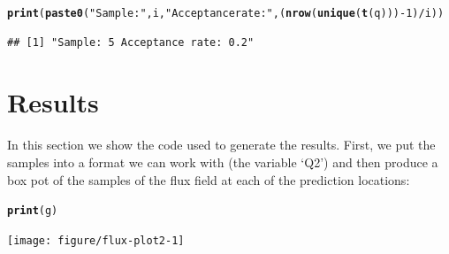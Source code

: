 \documentclass[a4paper,11pt]{article}\usepackage[]{graphicx}\usepackage[]{color}
\makeatletter
\newcommand{\hlnum}[1]{\textcolor[rgb]{0.686,0.059,0.569}{#1}}%
\newcommand{\hlstr}[1]{\textcolor[rgb]{0.192,0.494,0.8}{#1}}%
\newcommand{\hlopt}[1]{\textcolor[rgb]{0,0,0}{#1}}%
\newcommand{\hlstd}[1]{\textcolor[rgb]{0.345,0.345,0.345}{#1}}%
\newcommand{\hlkwd}[1]{\textcolor[rgb]{0.737,0.353,0.396}{\textbf{#1}}}%
\newenvironment{kframe}{%
 \def\at@end@of@kframe{}%
 \ifinner\ifhmode%
  \def\at@end@of@kframe{\end{minipage}}%
  \begin{minipage}{\columnwidth}%
 \fi\fi%
 \def\FrameCommand##1{\hskip\@totalleftmargin \hskip-\fboxsep
 \colorbox{shadecolor}{##1}\hskip-\fboxsep
     \hskip-\linewidth \hskip-\@totalleftmargin \hskip\columnwidth}%
 \MakeFramed {\advance\hsize-\width
   \@totalleftmargin\z@ \linewidth\hsize
   \@setminipage}}%
 {\par\unskip\endMakeFramed%
 \at@end@of@kframe}
\newenvironment{knitrout}{}{} %
\makeatother
\begin{document}
\begin{knitrout}
\color{fgcolor}\begin{kframe}
\begin{alltt}
\hlkwd{print}\hlstd{(}\hlkwd{paste0}\hlstd{(}\hlstr{"Sample: "}\hlstd{,i,}\hlstr{" Acceptance rate: "}\hlstd{,(}\hlkwd{nrow}\hlstd{(}\hlkwd{unique}\hlstd{(}\hlkwd{t}\hlstd{(q)))}\hlopt{-}\hlnum{1}\hlstd{)}\hlopt{/}\hlstd{i))}
\end{alltt}
\begin{verbatim}
## [1] "Sample: 5 Acceptance rate: 0.2"
\end{verbatim}
\end{kframe}
\end{knitrout}

\section{Results}

In this section we show the code used to generate the results. First, we put the samples into a format we can work with (the variable `Q2') and then produce a box pot of the samples of the flux field at each of the prediction locations:



\begin{knitrout}
\color{fgcolor}\begin{kframe}
\begin{alltt}
\hlkwd{print}\hlstd{(g)}
\end{alltt}
\end{kframe}
\texttt{[image: figure/flux-plot2-1]} 

\end{knitrout}
\end{document}
